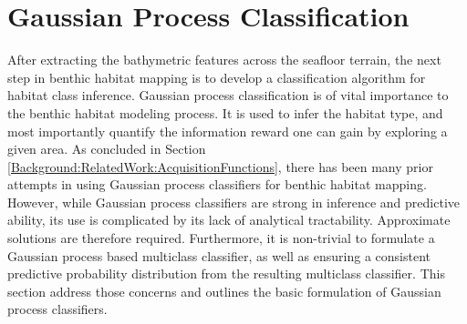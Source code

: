 	\section{Gaussian Process Classification}
	\label{BenthicHabitatMapping:Classification}
	
		After extracting the bathymetric features across the seafloor terrain, the next step in benthic habitat mapping is to develop a classification algorithm for habitat class inference. Gaussian process classification is of vital importance to the benthic habitat modeling process. It is used to infer the habitat type, and most importantly quantify the information reward one can gain by exploring a given area. As concluded in Section \ref{Background:RelatedWork:AcquisitionFunctions}, there has been many prior attempts in using Gaussian process classifiers for benthic habitat mapping. However, while Gaussian process classifiers are strong in inference and predictive ability, its use is complicated by its lack of analytical tractability. Approximate solutions are therefore required. Furthermore, it is non-trivial to formulate a Gaussian process based multiclass classifier, as well as ensuring a consistent predictive probability distribution from the resulting multiclass classifier. This section address those concerns and outlines the basic formulation of Gaussian process classifiers.
		
